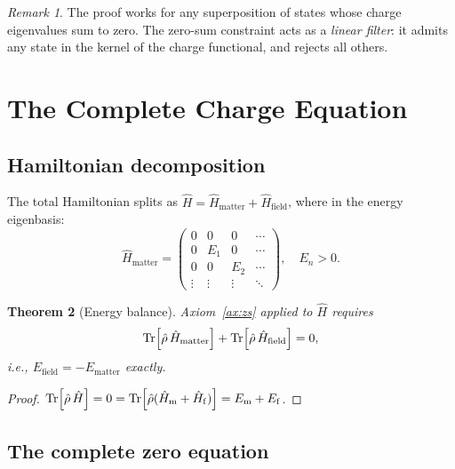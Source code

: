\documentclass[12pt,a4paper]{article}
\newtheorem{theorem}{Theorem}[section]
\theoremstyle{definition}
\theoremstyle{remark}
\newtheorem{remark}[theorem]{Remark}
\newcommand{\rhohat}{\hat{\rho}}
\newcommand{\Hhat}{\hat{H}}
\begin{document}
\begin{remark}
The proof works for any superposition of states whose charge eigenvalues
sum to zero.
The zero-sum constraint acts as a \emph{linear filter}: it admits any
state in the kernel of the charge functional, and rejects all others.
\end{remark}

\section{The Complete Charge Equation}
\label{sec:full_balance}

\subsection{Hamiltonian decomposition}

The total Hamiltonian splits as
$\Hhat = \Hhat_{\mathrm{matter}} + \Hhat_{\mathrm{field}}$,
where in the energy eigenbasis:
\begin{equation}
  \Hhat_{\mathrm{matter}} =
  \begin{pmatrix}
    0 & 0 & 0 & \cdots \\
    0 & E_1 & 0 & \cdots \\
    0 & 0 & E_2 & \cdots \\
    \vdots & \vdots & \vdots & \ddots
  \end{pmatrix},
  \quad E_n > 0.
\end{equation}

\begin{theorem}[Energy balance]\label{thm:energy_bal}
Axiom~\ref{ax:zs} applied to $\Hhat$ requires
\begin{equation}\label{eq:energy_balance}
  \Tr[\rhohat\,\Hhat_{\mathrm{matter}}]
  + \Tr[\rhohat\,\Hhat_{\mathrm{field}}] = 0,
\end{equation}
i.e., $E_{\mathrm{field}} = -E_{\mathrm{matter}}$ exactly.
\end{theorem}
\begin{proof}
$\Tr[\rhohat\,\Hhat] = 0 = \Tr[\rhohat(\Hhat_\mathrm{m}+\Hhat_\mathrm{f})]
 = E_\mathrm{m} + E_\mathrm{f}$.
\end{proof}

\subsection{The complete zero equation}
\end{document}
